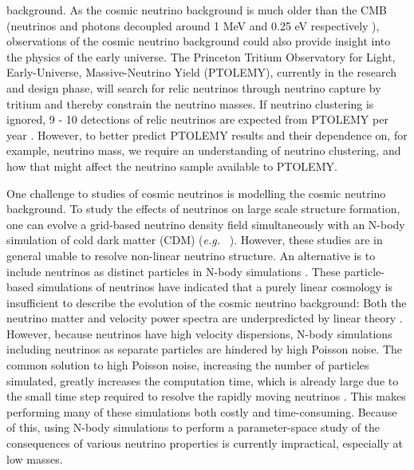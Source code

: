 \documentclass{aastex}
\newcommand{\eg}{\textit{e.g.}~}
\newcommand{\ptolemy}{PTOLEMY }
\newcommand{\ptolemyns}{PTOLEMY}
\begin{document}
background.  As the cosmic neutrino background is much older than the
CMB (neutrinos and photons decoupled around 1 MeV
and 0.25 eV respectively \citep{schneider}),
observations of the cosmic neutrino background could also provide
insight into the physics of the early universe.
The Princeton Tritium Observatory for Light, Early-Universe,
Massive-Neutrino Yield (\ptolemyns), currently in the research and design
phase, will search for relic neutrinos through neutrino capture by
tritium and thereby constrain the
neutrino masses.  
If neutrino
clustering is ignored, 9 - 10 detections of relic neutrinos are
expected from \ptolemy per year \citep{ptolemy}.  However, to better predict \ptolemy
results and their dependence on, for example, neutrino mass,
we require an understanding of neutrino clustering, and how that might
affect the neutrino sample available to \ptolemyns.



One challenge to studies of cosmic neutrinos is
modelling the cosmic neutrino background.  
To study the effects of neutrinos on large scale structure formation,
one can evolve
a grid-based neutrino
density field simultaneously with an N-body simulation of 
cold dark matter (CDM) (\eg
\cite{brandbyge08}).  However, these studies are in general
unable to resolve non-linear neutrino structure.
An alternative is to include neutrinos as
distinct particles in N-body simulations \citep{bird12,inman15}.
These particle-based simulations of neutrinos have
indicated that a purely linear cosmology is insufficient to describe
the evolution of the cosmic neutrino background: Both the neutrino
matter 
and velocity power spectra are underpredicted by linear
  theory \citep{brandbyge09,inman15}.
However, because neutrinos have high
velocity dispersions, N-body simulations including neutrinos as separate
particles are hindered by high Poisson noise. The
common solution to high Poisson noise,  increasing the
number 
of particles simulated, greatly increases the computation
time, which is already large due to the small time
step required to resolve the rapidly moving neutrinos \citep{brandbyge082,brandbyge08,brandbyge09}.  This
makes performing many of these simulations both costly and
time-consuming. 
 Because of this, using N-body simulations to perform a parameter-space 
study of the consequences of
various neutrino properties is currently
impractical, especially at low masses. 
\end{document}

